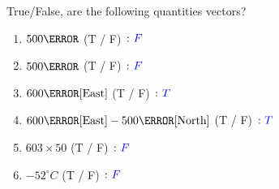 \documentclass[12pt]{article} %
\newcommand{\tx}[1]{\text{#1}}
\begin{document}
    \renewcommand*{\coursecode}{Physics Homework} %
    \renewcommand*{\assgnnumber}{2} %
    \renewcommand*{\submdate}{August 16, 2021} %
    \renewcommand*{\studentfname}{Abdullah} %
    \renewcommand*{\studentlname}{Zubair} %

    \renewcommand\qedsymbol{$\blacksquare$}
    \setfigpath
    \pagestyle{crowdmark}
    \fancyhfoffset[L,O]{0pt} %
\begin{qstn}[1] %
True/False, are the following quantities vectors?
    \begin{enumerate}[label=(\alph*)]
        \item $500 \m$ (T / F) $\colon \textcolor{blue}{F}$
        \item $500 \kg$ (T / F) $\colon \textcolor{blue}{F}$
        \item $600 \tx{\m} [\tx{East}]$ (T / F) $\colon \textcolor{blue}{T}$
        \item $600\tx{\m} [\tx{East}] - 500\tx{\m}[\tx{North}]$ (T / F) $\colon \textcolor{blue}{T}$
        \item $603 \times 50$ (T / F) $\colon \textcolor{blue}{F}$
        \item $-52^\circ C$ (T / F) $\colon \textcolor{blue}{F}$
    \end{enumerate}


 \end{qstn}
\end{document}

